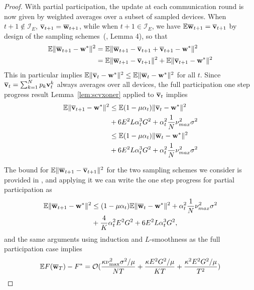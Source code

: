 \begin{proof}
	With partial participation, the update at each communication round
	is now given by weighted averages over a subset of sampled devices. When $t+1\notin\mathcal{I}_{E}$,
	${\overline{\mathbf{v}}}_{t+1}={\overline{\mathbf{w}}}_{t+1}$, while when $t+1\in\mathcal{I}_{E}$,
	we have $\mathbb{E}{\overline{\mathbf{w}}}_{t+1}={\overline{\mathbf{v}}}_{t+1}$ by design
	of the sampling schemes~(\cite{li2019convergence}, Lemma 4), so that 
	\begin{align*}
	\mathbb{E}\|{\overline{\mathbf{w}}}_{t+1}-{\mathbf{w}}^{\ast}\|^{2} & =\mathbb{E}\|{\overline{\mathbf{w}}}_{t+1}-{\overline{\mathbf{v}}}_{t+1}+{\overline{\mathbf{v}}}_{t+1}-{\mathbf{w}}^{\ast}\|^{2}\\
	& =\mathbb{E}\|{\overline{\mathbf{w}}}_{t+1}-{\overline{\mathbf{v}}}_{t+1}\|^{2}+\mathbb{E}\|{\overline{\mathbf{v}}}_{t+1}-{\mathbf{w}}^{\ast}\|^{2}
	\end{align*}
	This in particular implies $\mathbb{E}\|{\overline{\mathbf{v}}}_{t}-{\mathbf{w}}^{\ast}\|^{2}\leq \mathbb{E}\|{\overline{\mathbf{w}}}_{t}-{\mathbf{w}}^{\ast}\|^{2}$ for all $t$.
	Since ${\overline{\mathbf{v}}}_t =\sum_{k=1}^{N} p_{k} \mathbf{v}_{t}^{k}$ always averages over all devices, the full participation one step progress result Lemma~\ref{lem:scvxoner} applied to ${\overline{\mathbf{v}}}_t$  implies
	\begin{align*}
	   \mathbb{E}\|{\overline{\mathbf{v}}}_{t+1}-{\mathbf{w}}^{\ast}\|^{2} & \leq\mathbb{E}(1-\mu\alpha_{t})\|{\overline{\mathbf{v}}}_{t}-{\mathbf{w}}^{\ast}\|^{2}\\
	   & +6E^{2}L\alpha_{t}^{3}G^{2}+\alpha_{t}^{2}\frac{1}{N}\nu_{max}^{2}\sigma^{2}\\ &
	   \leq\mathbb{E}(1-\mu\alpha_{t})\|{\overline{\mathbf{w}}}_{t}-{\mathbf{w}}^{\ast}\|^{2}\\
	   & +6E^{2}L\alpha_{t}^{3}G^{2}+\alpha_{t}^{2}\frac{1}{N}\nu_{max}^{2}\sigma^{2}
	\end{align*}
	
	The bound for $\mathbb{E}\|{\overline{\mathbf{w}}}_{t+1}-{\overline{\mathbf{v}}}_{t+1}\|^{2}$ for the two sampling schemes we consider is provided in \eq{\ref{eq:partialsample}}, and applying it we can write the one step progress for partial participation as
	\begin{align}\label{eqn:scvx-partial-oner}
	\mathbb{E}\|\ov{w}_{t+1}-\vw^{\ast}\|^{2} & \leq(1-\mu\alpha_{t})\mathbb{E}\|\ov{w}_{t}-\vw^{\ast}\|^{2}+\alpha_{t}^{2}\frac{1}{N}\nu_{max}^{2}\sigma^{2}\nonumber\\
	&+\frac{4}{K}\alpha_{t}^{2}E^{2}G^{2}+6E^{2}L\alpha_{t}^{3}G^{2},
	\end{align}
	and the same arguments using induction and $L$-smoothness as the full participation case implies 
	\begin{align*}
	\mathbb{E}F({\overline{\mathbf{w}}}_{T})-F^{\ast}=\mathcal{O}(\frac{\kappa\nu_{\max}^{2}\sigma^{2}/\mu}{NT}
	+\frac{\kappa E^{2}G^{2}/\mu}{KT}+\frac{\kappa^{2}E^{2}G^{2}/\mu}{T^{2}})
	\end{align*}
	

\end{proof}
